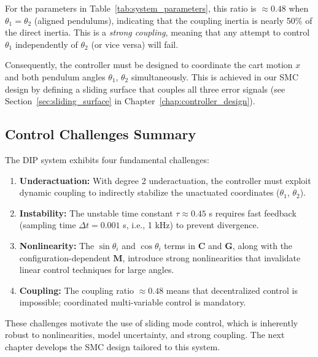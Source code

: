 For the parameters in Table~\ref{tab:system_parameters}, this ratio is $\approx 0.48$ when $\theta_1 = \theta_2$ (aligned pendulums), indicating that the coupling inertia is nearly 50\% of the direct inertia. This is a \textit{strong coupling}, meaning that any attempt to control $\theta_1$ independently of $\theta_2$ (or vice versa) will fail.

Consequently, the controller must be designed to coordinate the cart motion $x$ and both pendulum angles $\theta_1$, $\theta_2$ simultaneously. This is achieved in our SMC design by defining a sliding surface that couples all three error signals (see Section~\ref{sec:sliding_surface} in Chapter~\ref{chap:controller_design}).

\subsection{Control Challenges Summary}

The DIP system exhibits four fundamental challenges:

\begin{enumerate}
\item \textbf{Underactuation:} With degree 2 underactuation, the controller must exploit dynamic coupling to indirectly stabilize the unactuated coordinates ($\theta_1$, $\theta_2$).

\item \textbf{Instability:} The unstable time constant $\tau \approx 0.45$ s requires fast feedback (sampling time $\Delta t = 0.001$ s, i.e., 1 kHz) to prevent divergence.

\item \textbf{Nonlinearity:} The $\sin\theta_i$ and $\cos\theta_i$ terms in $\mathbf{C}$ and $\mathbf{G}$, along with the configuration-dependent $\mathbf{M}$, introduce strong nonlinearities that invalidate linear control techniques for large angles.

\item \textbf{Coupling:} The coupling ratio $\approx 0.48$ means that decentralized control is impossible; coordinated multi-variable control is mandatory.
\end{enumerate}

These challenges motivate the use of sliding mode control, which is inherently robust to nonlinearities, model uncertainty, and strong coupling. The next chapter develops the SMC design tailored to this system.

